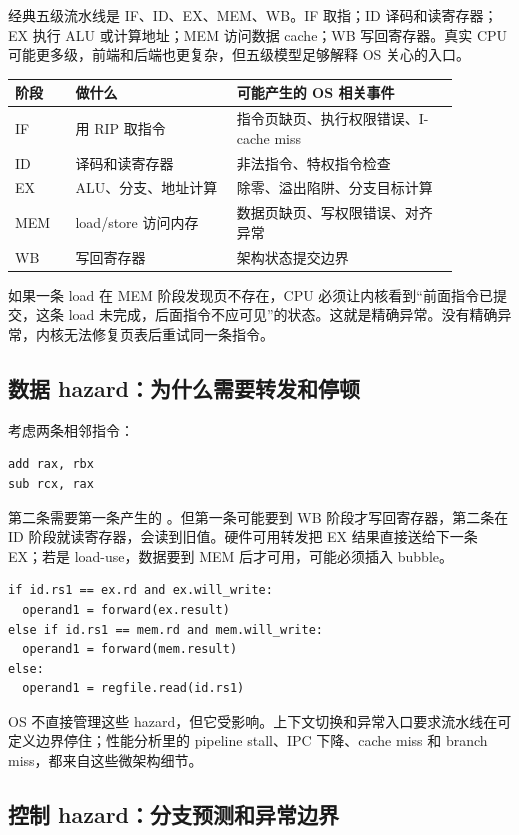 经典五级流水线是 IF、ID、EX、MEM、WB。IF 取指；ID 译码和读寄存器；EX 执行 ALU 或计算地址；MEM 访问数据 cache；WB 写回寄存器。真实 CPU 可能更多级，前端和后端也更复杂，但五级模型足够解释 OS 关心的入口。

\begin{longtable}{p{0.12\linewidth}p{0.32\linewidth}p{0.44\linewidth}}
\toprule
阶段 & 做什么 & 可能产生的 OS 相关事件 \\
\midrule
IF & 用 RIP 取指令 & 指令页缺页、执行权限错误、I-cache miss \\
ID & 译码和读寄存器 & 非法指令、特权指令检查 \\
EX & ALU、分支、地址计算 & 除零、溢出陷阱、分支目标计算 \\
MEM & load/store 访问内存 & 数据页缺页、写权限错误、对齐异常 \\
WB & 写回寄存器 & 架构状态提交边界 \\
\bottomrule
\end{longtable}

如果一条 load 在 MEM 阶段发现页不存在，CPU 必须让内核看到“前面指令已提交，这条 load 未完成，后面指令不应可见”的状态。这就是精确异常。没有精确异常，内核无法修复页表后重试同一条指令。

\subsection{数据 hazard：为什么需要转发和停顿}

考虑两条相邻指令：

\begin{lstlisting}
add rax, rbx
sub rcx, rax
\end{lstlisting}

第二条需要第一条产生的 。但第一条可能要到 WB 阶段才写回寄存器，第二条在 ID 阶段就读寄存器，会读到旧值。硬件可用转发把 EX 结果直接送给下一条 EX；若是 load-use，数据要到 MEM 后才可用，可能必须插入 bubble。

\begin{lstlisting}
if id.rs1 == ex.rd and ex.will_write:
  operand1 = forward(ex.result)
else if id.rs1 == mem.rd and mem.will_write:
  operand1 = forward(mem.result)
else:
  operand1 = regfile.read(id.rs1)
\end{lstlisting}

OS 不直接管理这些 hazard，但它受影响。上下文切换和异常入口要求流水线在可定义边界停住；性能分析里的 pipeline stall、IPC 下降、cache miss 和 branch miss，都来自这些微架构细节。

\subsection{控制 hazard：分支预测和异常边界}

